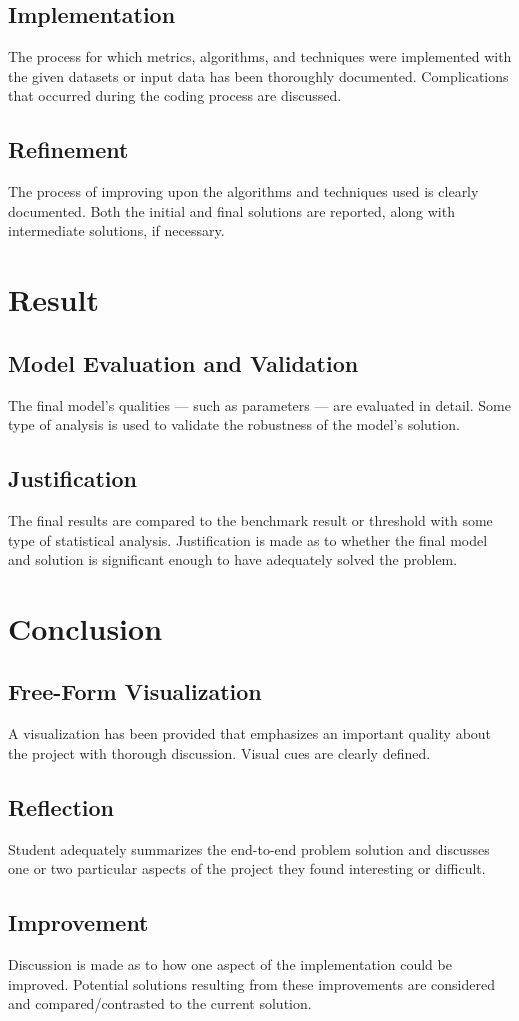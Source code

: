 \documentclass[a4paper,10pt,fleqn]{article}
\begin{document}
\subsection{Implementation}
The process for which metrics, algorithms, and techniques were implemented with the given datasets or input data has been thoroughly documented. Complications that occurred during the coding process are discussed.

\subsection{Refinement}
The process of improving upon the algorithms and techniques used is clearly documented. Both the initial and final solutions are reported, along with intermediate solutions, if necessary.



\section{Result}
\subsection{Model Evaluation and Validation}
The final model’s qualities — such as parameters — are evaluated in detail. Some type of analysis is used to validate the robustness of the model’s solution.

\subsection{Justification}
The final results are compared to the benchmark result or threshold with some type of statistical analysis. Justification is made as to whether the final model and solution is significant enough to have adequately solved the problem.




\section{Conclusion}
\subsection{Free-Form Visualization}
A visualization has been provided that emphasizes an important quality about the project with thorough discussion. Visual cues are clearly defined.

\subsection{Reflection}
Student adequately summarizes the end-to-end problem solution and discusses one or two particular aspects of the project they found interesting or difficult.

\subsection{Improvement}
Discussion is made as to how one aspect of the implementation could be improved. Potential solutions resulting from these improvements are considered and compared/contrasted to the current solution.
\end{document}
